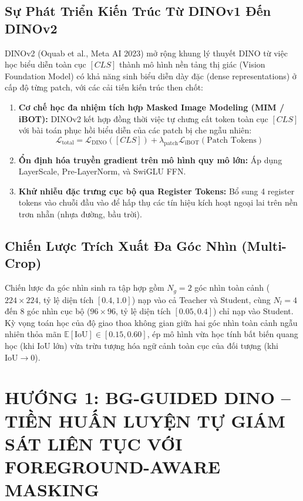 \documentclass[11pt,a4paper]{article}
\begin{document}
\subsection{Sự Phát Triển Kiến Trúc Từ DINOv1 Đến DINOv2}
DINOv2 (Oquab et al., Meta AI 2023) mở rộng khung lý thuyết DINO từ việc học biểu diễn toàn cục $[CLS]$ thành mô hình nền tảng thị giác (Vision Foundation Model) có khả năng sinh biểu diễn dày đặc (dense representations) ở cấp độ từng patch, với các cải tiến kiến trúc then chốt:
\begin{enumerate}
    \item \textbf{Cơ chế học đa nhiệm tích hợp Masked Image Modeling (MIM / iBOT):} DINOv2 kết hợp đồng thời việc tự chưng cất token toàn cục $[CLS]$ với bài toán phục hồi biểu diễn của các patch bị che ngẫu nhiên:
    \begin{equation}
        \mathcal{L}_{\text{total}} = \mathcal{L}_{\text{DINO}}([CLS]) + \lambda_{\text{patch}} \mathcal{L}_{\text{iBOT}}(\text{Patch Tokens})
    \end{equation}
    \item \textbf{Ổn định hóa truyền gradient trên mô hình quy mô lớn:} Áp dụng LayerScale, Pre-LayerNorm, và SwiGLU FFN.
    \item \textbf{Khử nhiễu đặc trưng cục bộ qua Register Tokens:} Bổ sung 4 register tokens vào chuỗi đầu vào để hấp thụ các tín hiệu kích hoạt ngoại lai trên nền trơn nhẵn (nhựa đường, bầu trời).
\end{enumerate}

\subsection{Chiến Lược Trích Xuất Đa Góc Nhìn (Multi-Crop)}
Chiến lược đa góc nhìn sinh ra tập hợp gồm $N_g = 2$ góc nhìn toàn cảnh ($224 \times 224$, tỷ lệ diện tích $[0.4, 1.0]$) nạp vào cả Teacher và Student, cùng $N_l = 4$ đến $8$ góc nhìn cục bộ ($96 \times 96$, tỷ lệ diện tích $[0.05, 0.4]$) chỉ nạp vào Student. 
Kỳ vọng toán học của độ giao thoa không gian giữa hai góc nhìn toàn cảnh ngẫu nhiên thỏa mãn $\mathbb{E}[\text{IoU}] \in [0.15, 0.60]$, ép mô hình vừa học tính bất biến quang học (khi $\text{IoU}$ lớn) vừa trừu tượng hóa ngữ cảnh toàn cục của đối tượng (khi $\text{IoU} \to 0$).

\section{HƯỚNG 1: BG-GUIDED DINO -- TIỀN HUẤN LUYỆN TỰ GIÁM SÁT LIÊN TỤC VỚI FOREGROUND-AWARE MASKING}
\end{document}
